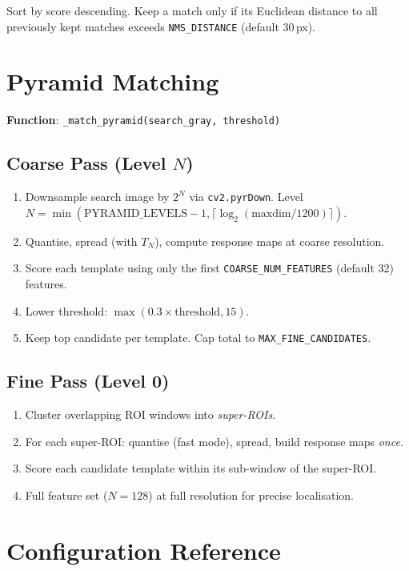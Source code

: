 \documentclass[11pt,a4paper]{article}
\begin{document}
Sort by score descending. Keep a match only if its Euclidean distance to all previously kept matches exceeds \texttt{NMS\_DISTANCE} (default 30\,px).

\section{Pyramid Matching}\label{sec:pyramid}
\textbf{Function}: \texttt{\_match\_pyramid(search\_gray, threshold)}

\subsection{Coarse Pass (Level $N$)}
\begin{enumerate}
\item Downsample search image by $2^N$ via \texttt{cv2.pyrDown}. Level $N = \min(\text{PYRAMID\_LEVELS}-1, \lceil\log_2(\text{maxdim}/1200)\rceil)$.
\item Quantise, spread (with $T_N$), compute response maps at coarse resolution.
\item Score each template using only the first \texttt{COARSE\_NUM\_FEATURES} (default 32) features.
\item Lower threshold: $\max(0.3 \times \text{threshold}, 15)$.
\item Keep top candidate per template. Cap total to \texttt{MAX\_FINE\_CANDIDATES}.
\end{enumerate}

\subsection{Fine Pass (Level 0)}
\begin{enumerate}
\item Cluster overlapping ROI windows into \emph{super-ROIs}.
\item For each super-ROI: quantise (fast mode), spread, build response maps \emph{once}.
\item Score each candidate template within its sub-window of the super-ROI.
\item Full feature set ($N=128$) at full resolution for precise localisation.
\end{enumerate}

\section{Configuration Reference}
\end{document}
